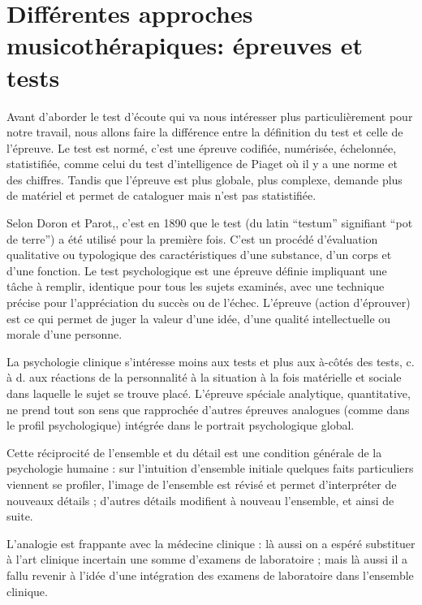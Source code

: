 \chapter{Différentes approches musicothérapiques: épreuves
  et tests}
Avant d'aborder le test d'écoute qui va nous intéresser plus
particulièrement pour notre travail, nous allons faire la différence
entre la définition du test et celle de l'épreuve.
Le test est normé, c'est une épreuve codifiée, numérisée, échelonnée,
statistifiée, comme celui du test d'intelligence de Piaget où il y a une
norme et des chiffres. Tandis que l'épreuve est plus globale, plus complexe,
demande plus de matériel et permet de
cataloguer mais n'est pas statistifiée.

Selon Doron et Parot,\autocite {doronparot}, c'est en 1890 que le test (du latin ``testum''
signifiant ``pot de terre'') a été utilisé pour la
première fois. C'est un procédé d'évaluation qualitative ou
typologique des caractéristiques d'une substance, d'un corps et d'une
fonction.
Le test psychologique est une épreuve définie impliquant une tâche à
remplir, identique pour tous les sujets examinés, avec une technique
précise pour l'appréciation du succès ou de l'échec.
L'épreuve (action d'éprouver) est ce qui permet de juger la valeur
d'une idée, d'une qualité intellectuelle ou morale d'une personne.

La psychologie clinique s’intéresse moins
aux tests et plus aux à-côtés des tests, c. à d. aux réactions de la
personnalité à la situation à la fois matérielle et sociale dans
laquelle le sujet se trouve placé. L’épreuve spéciale analytique,
quantitative, ne prend tout son sens que rapprochée d’autres épreuves
analogues (comme dans le profil psychologique) intégrée dans le
portrait psychologique global.

Cette réciprocité de l’ensemble et du détail est une condition générale de la psychologie humaine : sur l’intuition d’ensemble initiale quelques faits particuliers viennent se profiler, l’image de l’ensemble est révisé et permet d’interpréter de nouveaux détails ; d’autres détails modifient à nouveau l’ensemble, et ainsi de suite.


L’analogie est frappante avec la médecine clinique : là aussi on a
espéré substituer à l’art clinique incertain une somme d’examens de
laboratoire ; mais là aussi il a fallu revenir à l’idée d’une
intégration des examens de laboratoire dans l’ensemble clinique.



